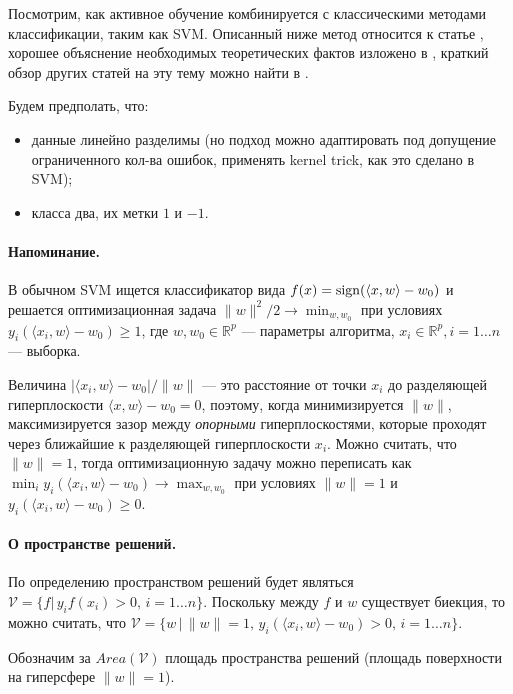 \documentclass[specialist, 12pt, href]{article}
\begin{document}
Посмотрим, как активное обучение комбинируется с классическими методами
классификации, таким как SVM. Описанный ниже метод относится к статье
\cite{TongKoller}, хорошее объяснение необходимых теоретических фактов изложено в \cite{DDBAL}, краткий обзор других статей на эту тему можно
найти в \cite{Settles}.

Будем предполать, что:

\begin{itemize}
\item
  данные линейно разделимы (но подход можно адаптировать под допущение
  ограниченного кол-ва ошибок, применять kernel trick, как это сделано в
  SVM);
\item
  класса два, их метки \(1\) и \(-1\).
\end{itemize}

\paragraph{Напоминание.}

В обычном SVM ищется классификатор вида
\(f(x) = {\rm sign}(\langle x, w \rangle - w_0)\) и решается
оптимизационная задача \(\|w\|^2/2 \to \min_{w, w_0}\) при условиях
\(y_i(\langle x_i, w \rangle - w_0) \geq 1\), где \(w, w_0 \in \mathbb{R}^p\) ---
параметры алгоритма, \(x_i \in \mathbb{R}^p, i = 1\ldots n\) --- выборка.

Величина \(|\langle x_i, w \rangle - w_0|/\|w\|\) --- это расстояние от
точки \(x_i\) до разделяющей гиперплоскости
\(\langle x, w \rangle - w_0 = 0\), поэтому, когда минимизируется
\(\|w\|\), максимизируется зазор между \emph{опорными} гиперплоскостями,
которые проходят через ближайшие к разделяющей гиперплоскости \(x_i\).
Можно считать, что \(\|w\| = 1\), тогда оптимизационную задачу можно
переписать как
\(\min_i y_i (\langle x_i, w \rangle - w_0) \to \max_{w, w_0}\) при
условиях \(\|w\| = 1\) и \(y_i(\langle x_i, w \rangle - w_0) \geq 0\).

\paragraph{О пространстве
решений.}

По определению пространством решений будет являться
\(\mathcal{V} = \{f |\, y_if(x_i) > 0,\, i = 1 \ldots n\}\). Поскольку
между \(f\) и \(w\) существует биекция, то можно считать, что
\(\mathcal{V} = \{w\,|\, \|w\| = 1,\, y_i (\langle x_i, w \rangle - w_0) > 0,\, i = 1\ldots n \}\).

Обозначим за \(Area(\mathcal{V})\) площадь пространства решений (площадь поверхности на гиперсфере \(\|w\| = 1\)).
\end{document}
